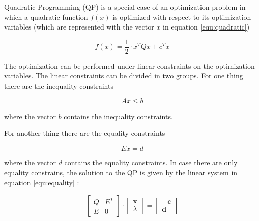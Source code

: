 Quadratic Programming (QP) is a special case of an optimization problem in which a quadratic function $f(x)$ is optimized with respect to its optimization variables (which are represented with the vector $x$ in equation \ref{equ:quadratic})

\begin{equation}
 f(x)  = \frac{1}{2} \cdot x^T Q x + c^T x 
\label{equ:quadratic}
\end{equation}

The optimization can be performed under linear constraints on the optimization variables. The linear constraints can be divided in two groups. For one thing there are the inequality constraints

\begin{equation}
A  x \leq b
\label{equ:inequalityConstraintsQP}
\end{equation}

where the vector $b$ contains the inequality constraints. \newline

For another thing there are the equality constraints

\begin{equation}
E  x = d
\end{equation}

where the vector $d$ contains the equality constraints. In case there are only equality constrains, the solution to the QP is given by the linear system in equation \ref{equ:equality} :





\begin{equation}
\begin{bmatrix}
   Q & E^T \\
   E & 0
\end{bmatrix} 
\cdot
\begin{bmatrix}
   \mathbf x \\
   \lambda
\end{bmatrix}
= 
\begin{bmatrix}
   -\mathbf c \\
   \mathbf d
\end{bmatrix}
\label{equ:equality}
\end{equation}


